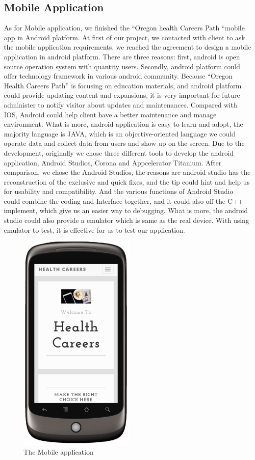 \documentclass[onecolumn, draftclsnofoot,10pt, compsoc]{IEEEtran}
\begin{document}
\subsection{Mobile Application}

\noindent As for Mobile application, we finished the “Oregon health Careers Path “mobile app in Android platform. At first of our project, we contacted with client to ask the mobile application requirements, we reached the agreement to design a mobile application in android platform. There are three reasons: first, android is open source operation system with quantity users. Secondly, android platform could offer technology framework in various android community. Because “Oregon Health Careers Path” is focusing on education materials, and android platform could provide updating content and expansions, it is very important for future administer to notify visitor about updates and maintenances. Compared with IOS, Android could help client have a better maintenance and manage environment. What is more, android application is easy to learn and adopt, the majority language is JAVA, which is an objective-oriented language we could operate data and collect data from users and show up on the screen. 
Due to the development, originally we chose three different tools to develop the android application, Android Studios, Corona and Appcelerator Titanium. After comparison, we chose the Android Studios, the reasons are android studio has the reconstruction of the exclusive and quick fixes, and the tip could hint and help us for usability and compatibility. And the various functions of Android Studio could combine the coding and Interface together, and it could also off the C++ implement, which give us an easier way to debugging. What is more, the android studio could also provide a emulator which is same as the real device. With using emulator to test, it is effective for us to test our application. \\

\begin{figure}
\centerline{\includegraphics[scale=1.5]{phone.png} }
\caption{The Mobile application}
\end{figure}
\end{document}
